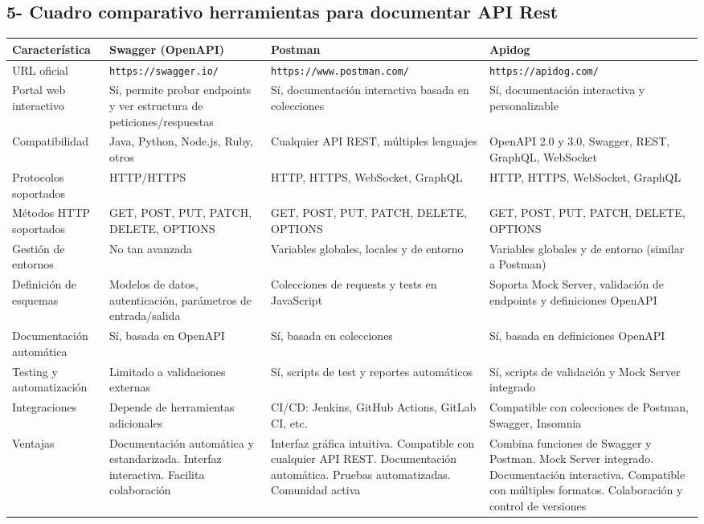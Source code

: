 \documentclass[man, floatsintext]{apa7}
\begin{document}
	\subsection {5- Cuadro comparativo herramientas para documentar API Rest}
	\begin{table}[h!]
		\centering
		\begin{tabular}{|p{4cm}|p{4cm}|p{4cm}|p{4cm}|}
			\hline
			\textbf{Característica} & \textbf{Swagger (OpenAPI)} & \textbf{Postman} & \textbf{Apidog} \\
			\hline
			URL oficial & \texttt{https://swagger.io/} & \texttt{https://www.postman.com/} & \texttt{https://apidog.com/} \\
			\hline
			Portal web interactivo & Sí, permite probar endpoints y ver estructura de peticiones/respuestas & Sí, documentación interactiva basada en colecciones & Sí, documentación interactiva y personalizable \\
			\hline
			Compatibilidad & Java, Python, Node.js, Ruby, otros & Cualquier API REST, múltiples lenguajes & OpenAPI 2.0 y 3.0, Swagger, REST, GraphQL, WebSocket \\
			\hline
			Protocolos soportados & HTTP/HTTPS & HTTP, HTTPS, WebSocket, GraphQL & HTTP, HTTPS, WebSocket, GraphQL \\
			\hline
			Métodos HTTP soportados & GET, POST, PUT, PATCH, DELETE, OPTIONS & GET, POST, PUT, PATCH, DELETE, OPTIONS & GET, POST, PUT, PATCH, DELETE, OPTIONS \\
			\hline
			Gestión de entornos & No tan avanzada & Variables globales, locales y de entorno & Variables globales y de entorno (similar a Postman) \\
			\hline
			Definición de esquemas & Modelos de datos, autenticación, parámetros de entrada/salida & Colecciones de requests y tests en JavaScript & Soporta Mock Server, validación de endpoints y definiciones OpenAPI \\
			\hline
			Documentación automática & Sí, basada en OpenAPI & Sí, basada en colecciones & Sí, basada en definiciones OpenAPI \\
			\hline
			Testing y automatización & Limitado a validaciones externas & Sí, scripts de test y reportes automáticos & Sí, scripts de validación y Mock Server integrado \\
			\hline
			Integraciones & Depende de herramientas adicionales & CI/CD: Jenkins, GitHub Actions, GitLab CI, etc. & Compatible con colecciones de Postman, Swagger, Insomnia \\
			\hline
			Ventajas & Documentación automática y estandarizada. Interfaz interactiva. Facilita colaboración & Interfaz gráfica intuitiva. Compatible con cualquier API REST. Documentación automática. Pruebas automatizadas. Comunidad activa & Combina funciones de Swagger y Postman. Mock Server integrado. Documentación interactiva. Compatible con múltiples formatos. Colaboración y control de versiones \\

\end{tabular}
\end{table}
\end{document}
